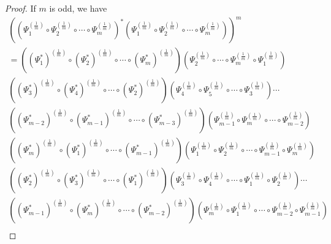 \documentclass[12pt, reqno]{amsart}
\theoremstyle{definition}
\theoremstyle{remark}
\numberwithin{equation}{section}
\begin{document}
\begin{proof}
If $m$ is odd, we have
\begin{align}
\nonumber
\left(\left(\Psi_1^{(\frac{1}{m})}\circ\Psi_2^{(\frac{1}{m})}\circ\cdots\circ\Psi_m^{(\frac{1}{m})}\right)^*\left(\Psi_1^{(\frac{1}{m})}\circ\Psi_2^{(\frac{1}{m})}\circ\cdots\circ\Psi_m^{(\frac{1}{m})}\right)\right)^{m}\;\;\;\;\;\;\;\;\;\;\;\;\;\;\;\;\;\;\;\;\;\;\;\;\;\;\;\\
\nonumber
=\left((\Psi_1^*)^{(\frac{1}{m})}\circ(\Psi_2^*)^{(\frac{1}{m})}\circ\cdots\circ(\Psi_m^*)^{(\frac{1}{m})}\right)\left(\Psi_2^{(\frac{1}{m})}
\circ\cdots\circ\Psi_m^{(\frac{1}{m})}\circ\Psi_1^{(\frac{1}{m})}\right)\;\;\;\;\;\;\;\;\;\;\;\;\;\;\;\;\;\;\\
\nonumber
\left((\Psi_3^*)^{(\frac{1}{m})}\circ(\Psi_4^*)^{(\frac{1}{m})}\circ\cdots\circ(\Psi_2^*)^{(\frac{1}{m})}\right)\left(\Psi_4^{(\frac{1}{m})}\circ\Psi_5^{(\frac{1}{m})}\circ\cdots\circ\Psi_3^{(\frac{1}{m})}\right)\cdots\;\;\;\;\;\;\;\;\;\;\;\;\;\;\;\;\;\;\\
\nonumber
\left((\Psi_{m-2}^*)^{(\frac{1}{m})}\circ(\Psi_{m-1}^*)^{(\frac{1}{m})}\circ\cdots\circ(\Psi_{m-3}^*)^{(\frac{1}{m})}\right)\left(\Psi_{m-1}^{(\frac{1}{m})}\circ\Psi_m^{(\frac{1}{m})}\circ\cdots\circ\Psi_{m-2}^{(\frac{1}{m})}\right)\;\;\;\;\;\;\;\;\;\\
\nonumber
\left((\Psi_m^*)^{(\frac{1}{m})}\circ(\Psi_1^*)^{(\frac{1}{m})}\circ\cdots\circ(\Psi_{m-1}^*)^{(\frac{1}{m})}\right)\left(\Psi_1^{(\frac{1}{m})}\circ\Psi_2^{(\frac{1}{m})}\circ\cdots\circ\Psi_{m-1}^{(\frac{1}{m})}\circ\Psi_m^{(\frac{1}{m})}\right)\;\;\;\;\;\;\\
\nonumber
\left((\Psi_2^*)^{(\frac{1}{m})}\circ(\Psi_3^*)^{(\frac{1}{m})}\circ\cdots\circ(\Psi_1^*)^{(\frac{1}{m})}\right)\left(\Psi_3^{(\frac{1}{m})}\circ\Psi_4^{(\frac{1}{m})}\circ\cdots\circ\Psi_1^{(\frac{1}{m})}\circ\Psi_2^{(\frac{1}{m})}\right)\cdots\;\;\;\;\;\;\;\\
\nonumber
\left((\Psi_{m-1}^*)^{(\frac{1}{m})}\circ(\Psi_{m}^*)^{(\frac{1}{m})}\circ\cdots\circ(\Psi_{m-2}^*)^{(\frac{1}{m})}\right)\left(\Psi_m^{(\frac{1}{m})}\circ\Psi_1^{(\frac{1}{m})}\circ\cdots\circ\Psi_{m-2}^{(\frac{1}{m})}\circ\Psi_{m-1}^{(\frac{1}{m})}\right)\\

\end{align}
\end{proof}
\end{document}

